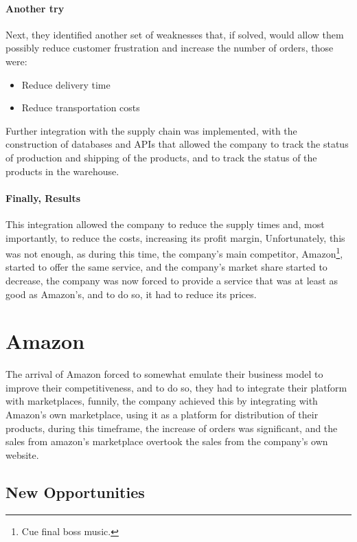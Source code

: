 \documentclass[openright, twoside, twocolumn]{report}
\begin{document}
\paragraph{Another try}

Next, they identified another set of weaknesses that, if solved, would allow them possibly reduce customer frustration and increase the number of orders, those were:

\begin{itemize}
  \item Reduce delivery time
  \item Reduce transportation costs
\end{itemize}

Further integration with the supply chain was implemented, with the construction of databases and APIs that allowed the company to track the status of production
and shipping of the products, and to track the status of the products in the warehouse.

\paragraph{Finally, Results}

This integration allowed the company to reduce the supply times and, most importantly, to reduce the costs, increasing its profit margin, Unfortunately, this was not enough,
as during this time, the company's main competitor, Amazon\footnote{
  Cue final boss music.
}, started to offer the same service, and the company's market share started to decrease, the company was now forced to provide a service that was
at least as good as Amazon's, and to do so, it had to reduce its prices.

\section{Amazon}
The arrival of Amazon forced to somewhat emulate their business model to improve their competitiveness, and to do so, they had to
integrate their platform with marketplaces, funnily, the company achieved this by integrating with Amazon's own marketplace, using
it as a platform for distribution of their products, during this timeframe, the increase of orders was significant, and the sales
from amazon's marketplace overtook the sales from the company's own website.

\subsection{New Opportunities}
\end{document}
